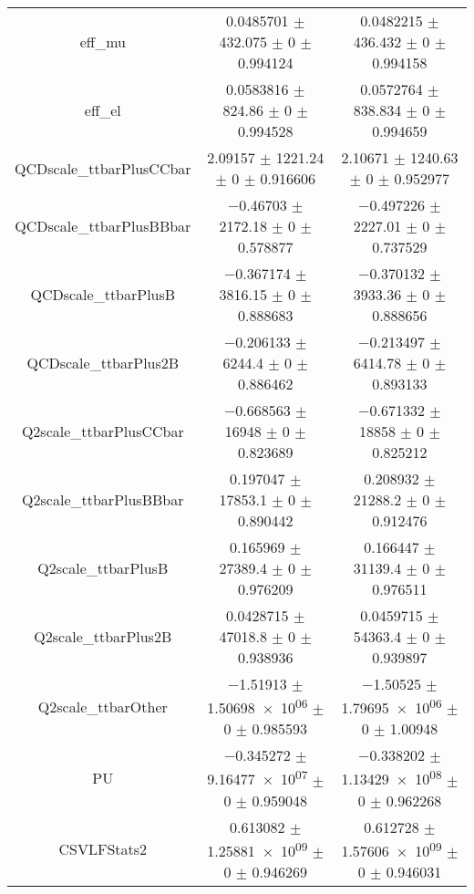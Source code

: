 \begin{table}
\begin{tabular}{ccc}
eff\_mu & \num{0.0485701} $\pm$ \num{432.075} $\pm$ \num{0} $\pm$ \num{0.994124} & \num{0.0482215} $\pm$ \num{436.432} $\pm$ \num{0} $\pm$ \num{0.994158}\\
eff\_el & \num{0.0583816} $\pm$ \num{824.86} $\pm$ \num{0} $\pm$ \num{0.994528} & \num{0.0572764} $\pm$ \num{838.834} $\pm$ \num{0} $\pm$ \num{0.994659}\\
QCDscale\_ttbarPlusCCbar & \num{2.09157} $\pm$ \num{1221.24} $\pm$ \num{0} $\pm$ \num{0.916606} & \num{2.10671} $\pm$ \num{1240.63} $\pm$ \num{0} $\pm$ \num{0.952977}\\
QCDscale\_ttbarPlusBBbar & \num{-0.46703} $\pm$ \num{2172.18} $\pm$ \num{0} $\pm$ \num{0.578877} & \num{-0.497226} $\pm$ \num{2227.01} $\pm$ \num{0} $\pm$ \num{0.737529}\\
QCDscale\_ttbarPlusB & \num{-0.367174} $\pm$ \num{3816.15} $\pm$ \num{0} $\pm$ \num{0.888683} & \num{-0.370132} $\pm$ \num{3933.36} $\pm$ \num{0} $\pm$ \num{0.888656}\\
QCDscale\_ttbarPlus2B & \num{-0.206133} $\pm$ \num{6244.4} $\pm$ \num{0} $\pm$ \num{0.886462} & \num{-0.213497} $\pm$ \num{6414.78} $\pm$ \num{0} $\pm$ \num{0.893133}\\
Q2scale\_ttbarPlusCCbar & \num{-0.668563} $\pm$ \num{16948} $\pm$ \num{0} $\pm$ \num{0.823689} & \num{-0.671332} $\pm$ \num{18858} $\pm$ \num{0} $\pm$ \num{0.825212}\\
Q2scale\_ttbarPlusBBbar & \num{0.197047} $\pm$ \num{17853.1} $\pm$ \num{0} $\pm$ \num{0.890442} & \num{0.208932} $\pm$ \num{21288.2} $\pm$ \num{0} $\pm$ \num{0.912476}\\
Q2scale\_ttbarPlusB & \num{0.165969} $\pm$ \num{27389.4} $\pm$ \num{0} $\pm$ \num{0.976209} & \num{0.166447} $\pm$ \num{31139.4} $\pm$ \num{0} $\pm$ \num{0.976511}\\
Q2scale\_ttbarPlus2B & \num{0.0428715} $\pm$ \num{47018.8} $\pm$ \num{0} $\pm$ \num{0.938936} & \num{0.0459715} $\pm$ \num{54363.4} $\pm$ \num{0} $\pm$ \num{0.939897}\\
Q2scale\_ttbarOther & \num{-1.51913} $\pm$ \num{1.50698e+06} $\pm$ \num{0} $\pm$ \num{0.985593} & \num{-1.50525} $\pm$ \num{1.79695e+06} $\pm$ \num{0} $\pm$ \num{1.00948}\\
PU & \num{-0.345272} $\pm$ \num{9.16477e+07} $\pm$ \num{0} $\pm$ \num{0.959048} & \num{-0.338202} $\pm$ \num{1.13429e+08} $\pm$ \num{0} $\pm$ \num{0.962268}\\
CSVLFStats2 & \num{0.613082} $\pm$ \num{1.25881e+09} $\pm$ \num{0} $\pm$ \num{0.946269} & \num{0.612728} $\pm$ \num{1.57606e+09} $\pm$ \num{0} $\pm$ \num{0.946031}\\

\end{tabular}
\end{table}

